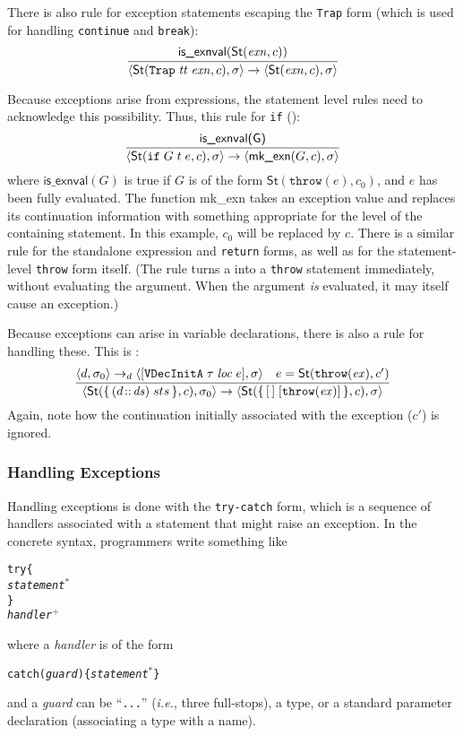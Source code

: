 \documentclass[11pt]{article}
\newcommand{\ie}{\emph{i.e.}}
\begin{document}
There is also rule  for exception statements
escaping the \texttt{Trap} form (which is used for handling
\texttt{continue} and \texttt{break}):
\[
\infer{
  \statebrack{
    \textsf{St}(\texttt{Trap}\;\mathit{tt}\;\mathit{exn}, c), \sigma
  }
  \to
  \statebrack{\textsf{St}(\mathit{exn},c), \sigma}
}{\textsf{is\_exnval}(\textsf{St}(\mathit{exn},c))}
\]

\medskip
Because exceptions arise from expressions, the statement level rules
need to acknowledge this possibility.  Thus, this rule for
\texttt{if} ():
\[
\infer{
  \statebrack{\textsf{St}(\texttt{if}\;G\;t\;e, c), \sigma}
  \to
  \statebrack{\textsf{mk\_exn}(G,c),\sigma}
}{
  \textsf{is\_exnval(G)}
}
\]
where $\textsf{is\_exnval}(G)$ is true if $G$ is of the form
$\textsf{St}(\texttt{throw}(e), c_0)$, and $e$ has been fully
evaluated.  The function \textsf{mk\_exn} takes an exception value and
replaces its continuation information with something appropriate for
the level of the containing statement.  In this example, $c_0$ will be
replaced by $c$.  There is a similar rule for the standalone
expression and \texttt{return} forms, as well as for the
statement-level \texttt{throw} form itself.  (The rule
 turns a \ethrow{} into a \texttt{throw}
statement immediately, without evaluating the argument.  When the
argument \emph{is} evaluated, it may itself cause an exception.)

Because exceptions can arise in variable declarations, there is also a
rule for handling these.  This is :
\[
\infer{
  \statebrack{
    \textsf{St}(\mathbf{\{}\,(d\!::\!\mathit{ds})\;sts\,\mathbf{\}}, c),
    \sigma_0
  }
  \to
  \statebrack{
    \textsf{St}(\mathbf{\{}\,[\,]\;[\texttt{throw}(\mathit{ex})]\,\mathbf{\}}, c),
    \sigma
  }
}{
  \statebrack{d,\sigma_0}\to_d
  \statebrack{[\texttt{VDecInitA}\;\tau\;\mathit{loc}\;e], \sigma}
  &
  e = \textsf{St}(\texttt{throw}(\mathit{ex}), c')
}
\]
Again, note how the continuation initially associated with the
exception ($c'$) is ignored.


\subsubsection{Handling Exceptions}

Handling exceptions is done with the \texttt{try-catch} form, which is a
sequence of handlers associated with a statement that might raise an
exception.  In the concrete syntax, programmers write something like
\newcommand{\suplus}{\ensuremath{^+}}
\newcommand{\sustar}{\ensuremath{^*}}
\begin{alltt}
   try \{
     \emph{statement}\sustar
   \}
   \emph{handler}\suplus
\end{alltt}
where a \emph{handler} is of the form
\begin{alltt}
   catch (\emph{guard}) \{ \emph{statement}\sustar \}
\end{alltt}
and a \emph{guard} can be ``\texttt{...}'' (\ie, three full-stops), a
type, or a standard parameter declaration (associating a type with a
name).
\end{document}
